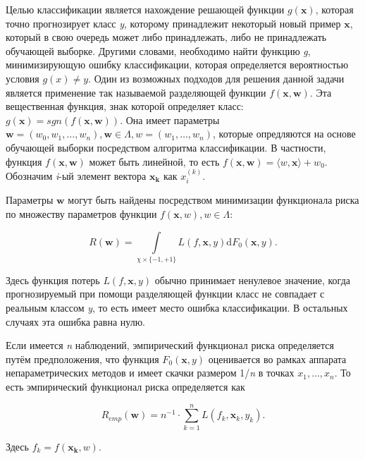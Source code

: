 \documentclass[12pt,a4paper,oneside]{article}
\begin{document}
\par
Целью классификации является нахождение решающей функции \(g(\mathbf{x})\), которая точно прогнозирует класс \emph{y}, которому принадлежит некоторый новый пример \(\mathbf{x}\), который в свою очередь может либо принадлежать, либо не принадлежать обучающей выборке. 
Другими словами, необходимо найти функцию \emph{g}, минимизирующую ошибку классификации, которая определяется вероятностью условия \(g(x) \neq y\). 
Один из возможных подходов для решения данной задачи является применение так называемой разделяющей функции \(f(\mathbf{x}, \mathbf{w})\). 
Эта вещественная функция, знак которой определяет класс: \(g(\mathbf{x})=sgn(f(\mathbf{x}, \mathbf{w}))\).
Она имеет параметры \(\mathbf{w}=(w_0, w_1, \dots, w_n), \mathbf{w} \in \Lambda, w = (w_1, \dots, w_n)\), которые опредляются на основе обучающей выборки посредством алгоритма классификации. 
В частности, функция \(f(\mathbf{x}, \mathbf{w})\) может быть линейной, то есть \(f(\mathbf{x}, \mathbf{w}) = \langle w, \mathbf{x} \rangle + w_0\). 
Обозначим \emph{i}-ый элемент вектора \(\mathbf{x_k}\) как \(x_i^{(k)}\). 

\par
Параметры \(\mathbf{w}\) могут быть найдены посредством минимизации функционала риска по множеству параметров функции \(f(\mathbf{x}, w), w \in \Lambda\):

\[
R(\mathbf{w}) = \int \limits_{\chi \times \{-1, +1\}} L(f, \mathbf{x}, y) \mathrm{d} F_0(\mathbf{x}, y).
\]

Здесь функция потерь \(L(f, \mathbf{x}, y)\) обычно принимает ненулевое значение, когда прогнозируемый при помощи разделяющей функции класс не совпадает с реальным классом \emph{y}, то есть имеет место ошибка классификации. 
В остальных случаях эта ошибка равна нулю. 

\par
Если имеется \emph{n} наблюдений, эмпирический функционал риска определяется путём предположения, что функция \(F_0(\mathbf{x}, y)\) оценивается во рамках аппарата непараметрических методов  и имеет скачки размером 1/\emph{n} в точках \(x_1, \dots, x_n\). 
То есть эмпирический функционал риска определяется как

\[
R_{emp}(\mathbf{w}) = n^{-1} \cdot \sum \limits_{k=1}^n L(f_k, \mathbf{x}_k, y_k).
\]

Здесь \(f_k=f(\mathbf{x_k}, w)\). 

\end{document}
